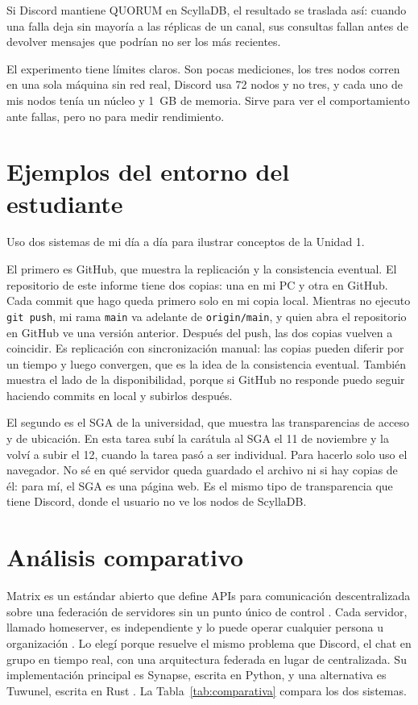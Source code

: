\documentclass[11pt,a4paper]{article}
\begin{document}
Si Discord mantiene QUORUM en ScyllaDB, el resultado se traslada así: cuando una falla deja sin mayoría a las réplicas de un canal, sus consultas fallan antes de devolver mensajes que podrían no ser los más recientes.

El experimento tiene límites claros. Son pocas mediciones, los tres nodos corren en una sola máquina sin red real, Discord usa 72 nodos y no tres, y cada uno de mis nodos tenía un núcleo y 1~GB de memoria. Sirve para ver el comportamiento ante fallas, pero no para medir rendimiento.

\section{Ejemplos del entorno del estudiante}\label{sec:entorno}

Uso dos sistemas de mi día a día para ilustrar conceptos de la Unidad 1.

El primero es GitHub, que muestra la replicación y la consistencia eventual. El repositorio de este informe tiene dos copias: una en mi PC y otra en GitHub. Cada commit que hago queda primero solo en mi copia local. Mientras no ejecuto \texttt{git push}, mi rama \texttt{main} va adelante de \texttt{origin/main}, y quien abra el repositorio en GitHub ve una versión anterior. Después del push, las dos copias vuelven a coincidir. Es replicación con sincronización manual: las copias pueden diferir por un tiempo y luego convergen, que es la idea de la consistencia eventual. También muestra el lado de la disponibilidad, porque si GitHub no responde puedo seguir haciendo commits en local y subirlos después.

El segundo es el SGA de la universidad, que muestra las transparencias de acceso y de ubicación. En esta tarea subí la carátula al SGA el 11 de noviembre y la volví a subir el 12, cuando la tarea pasó a ser individual. Para hacerlo solo uso el navegador. No sé en qué servidor queda guardado el archivo ni si hay copias de él: para mí, el SGA es una página web. Es el mismo tipo de transparencia que tiene Discord, donde el usuario no ve los nodos de ScyllaDB.

\section{Análisis comparativo}\label{sec:comparativo}

Matrix es un estándar abierto que define APIs para comunicación descentralizada sobre una federación de servidores sin un punto único de control \cite{MatrixSpec}. Cada servidor, llamado homeserver, es independiente y lo puede operar cualquier persona u organización \cite{Martins2026}. Lo elegí porque resuelve el mismo problema que Discord, el chat en grupo en tiempo real, con una arquitectura federada en lugar de centralizada. Su implementación principal es Synapse, escrita en Python, y una alternativa es Tuwunel, escrita en Rust \cite{Viana2026}. La Tabla~\ref{tab:comparativa} compara los dos sistemas.
\end{document}

